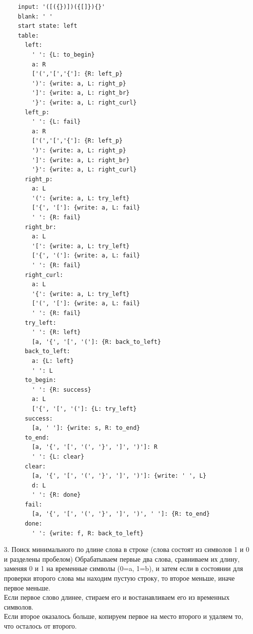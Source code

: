 \documentclass[12pt]{article}
\begin{document}
	\begin{lstlisting}
	input: '([({})])({[]}){}'
	blank: ' '
	start state: left
	table:
	  left:
	    ' ': {L: to_begin}
	    a: R
	    ['(','[','{']: {R: left_p}
	    ')': {write: a, L: right_p}
	    ']': {write: a, L: right_br}
	    '}': {write: a, L: right_curl}
	  left_p:
	    ' ': {L: fail}
	    a: R
	    ['(','[','{']: {R: left_p}
	    ')': {write: a, L: right_p}
	    ']': {write: a, L: right_br}
	    '}': {write: a, L: right_curl}
	  right_p:
	    a: L
	    '(': {write: a, L: try_left}
	    ['{', '[']: {write: a, L: fail}
	    ' ': {R: fail}
	  right_br:
	    a: L
	    '[': {write: a, L: try_left}
	    ['{', '(']: {write: a, L: fail}
	    ' ': {R: fail}
	  right_curl:
	    a: L
	    '{': {write: a, L: try_left}
	    ['(', '[']: {write: a, L: fail}
	    ' ': {R: fail}
	  try_left:
	    ' ': {R: left}
	    [a, '{', '[', '(']: {R: back_to_left}
	  back_to_left:
	    a: {L: left}
	    ' ': L
	  to_begin:
	    ' ': {R: success}
	    a: L
	    ['{', '[', '(']: {L: try_left}
	  success:
	    [a, ' ']: {write: s, R: to_end}
	  to_end:
	    [a, '{', '[', '(', '}', ']', ')']: R
	    ' ': {L: clear}
	  clear: 
	    [a, '{', '[', '(', '}', ']', ')']: {write: ' ', L}
	    d: L
	    ' ': {R: done}
	  fail:
	    [a, '{', '[', '(', '}', ']', ')', ' ']: {R: to_end}
	  done:
	    ' ': {write: f, R: back_to_left}
	\end{lstlisting}
	3. Поиск минимального по длине слова в строке (слова состоят из символов 1 и 0 и разделены пробелом)
	\indent Обрабатываем первые два слова, сравниваем их длину, заменяя 0 и 1 на временные символы (0=a, 1=b), и затем если в состоянии для проверки второго слова мы находим пустую строку, то второе меньше, иначе первое меньше.\\
	\indent Если первое слово длинее, стираем его и востанавливаем его из временных символов.\\
	\indent Если второе оказалось больше, копируем первое на место второго и удаляем то, что осталось от второго.
\end{document}
